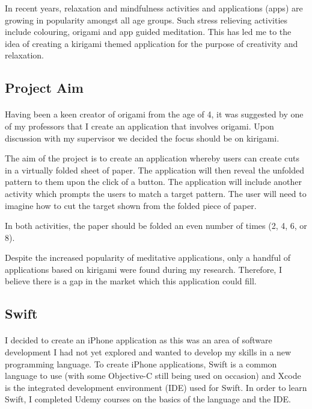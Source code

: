 \documentclass[11pt]{article}
\begin{document}
               In recent years, relaxation and mindfulness activities and applications (apps) are growing in popularity amongst all age groups. Such stress relieving activities include colouring, origami and app guided meditation. This has led me to the idea of creating a kirigami themed application for the purpose of creativity and relaxation.
    
            \subsection{Project Aim}
            
                 \paragraph{} 
                 
                  Having been a keen creator of origami from the age of 4, it was suggested by one of my professors that I create an application that involves origami. Upon discussion with my supervisor we decided the focus should be on kirigami. 
                  
                  The aim of the project is to create an application whereby users can create cuts in a virtually folded sheet of paper. The application will then reveal the unfolded pattern to them upon the click of a button. The application will include another activity which prompts the users to match a target pattern. The user will need to imagine how to cut the target shown from the folded piece of paper.
                  
                  In both activities, the paper should be folded an even number of times (2, 4, 6, or 8).
                  
                  Despite the increased popularity of meditative applications, only a handful of applications based on kirigami were found during my research. Therefore, I believe there is a gap in the market which this application could fill.


                  \subsection{Swift}
               
                \paragraph{} 
                    I decided to create an iPhone application as this was an area of software development I had not yet explored and wanted to develop my skills in a new programming language. To create iPhone applications, Swift is a common language to use (with some Objective-C still being used on occasion) and Xcode is the integrated development environment (IDE) used for Swift. In order to learn Swift, I completed Udemy courses \cite{Udemy} on the basics of the language and the IDE. 
                   
\end{document}
